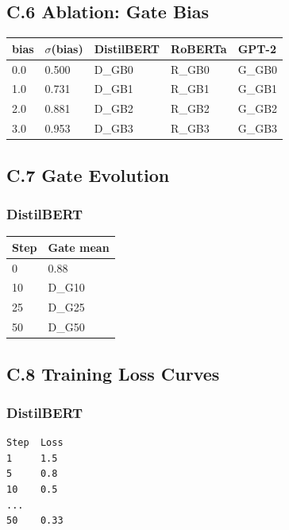 \subsection{C.6 Ablation: Gate Bias}

\begin{table}[H]
\centering
\small
\begin{tabular}{lllll}
\toprule
\textbf{bias} & \textbf{$\sigma$(bias)} & \textbf{DistilBERT} & \textbf{RoBERTa} & \textbf{GPT-2} \\
\midrule
0.0 & 0.500 & {{D\_GB0}} & {{R\_GB0}} & {{G\_GB0}} \\
1.0 & 0.731 & {{D\_GB1}} & {{R\_GB1}} & {{G\_GB1}} \\
2.0 & 0.881 & {{D\_GB2}} & {{R\_GB2}} & {{G\_GB2}} \\
3.0 & 0.953 & {{D\_GB3}} & {{R\_GB3}} & {{G\_GB3}} \\
\bottomrule
\end{tabular}
\end{table}

\subsection{C.7 Gate Evolution}

\subsubsection{DistilBERT}

\begin{table}[H]
\centering
\small
\begin{tabular}{ll}
\toprule
\textbf{Step} & \textbf{Gate mean} \\
\midrule
0 & 0.88 \\
10 & {{D\_G10}} \\
25 & {{D\_G25}} \\
50 & {{D\_G50}} \\
\bottomrule
\end{tabular}
\end{table}

\subsection{C.8 Training Loss Curves}

\subsubsection{DistilBERT}
\begin{lstlisting}
Step  Loss
1     1.5
5     0.8
10    0.5
...
50    0.33
\end{lstlisting}

